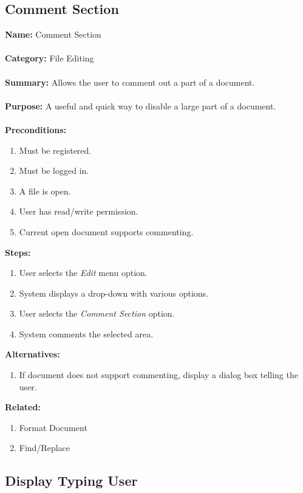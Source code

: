 \documentclass[14pt, a4paper]{article}
\begin{document}
\subsection{Comment Section}

\begin{framed}
	\noindent\textbf{Name:} Comment Section \\ \\
	\textbf{Category:} File Editing \\ \\
	\textbf{Summary:} Allows the user to comment out a part of a document. \\ \\
	\textbf{Purpose:} A useful and quick way to disable a large part of a document. \\ \\
	\textbf{Preconditions:} 
	\begin{enumerate}
		\item Must be registered.
		\item Must be logged in.
		\item A file is open.
		\item User has read/write permission.
		\item Current open document supports commenting.
	\end{enumerate}
	\textbf{Steps:}
	\begin{enumerate}
		\item User selects the \textit{Edit} menu option.
		\item System displays a drop-down with various options.
		\item User selects the \textit{Comment Section} option.
		\item System comments the selected area.
	\end{enumerate}
	\textbf{Alternatives:}
	\begin{enumerate}
		\item If document does not support commenting, display a dialog box telling the user.
	\end{enumerate}
	\textbf{Related:}
	\begin{enumerate}
		\item Format Document
		\item Find/Replace
	\end{enumerate}
\end{framed}

\newpage

\subsection{Display Typing User}
\end{document}
